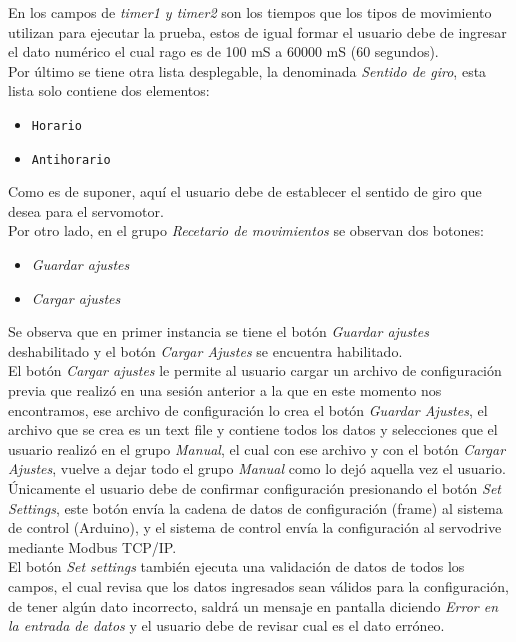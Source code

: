 \documentclass[12pt,titlepage]{article}
\begin{document}
En los campos de \textit{timer1 y timer2} son los tiempos que los tipos de movimiento utilizan para ejecutar la prueba, estos de igual formar el usuario debe de ingresar el dato numérico el cual rago es de 100 mS a 60000 mS (60 segundos). \\

Por último se tiene otra lista desplegable, la denominada \textit{Sentido de giro}, esta lista solo contiene dos elementos: \\
\begin{itemize}
\item \texttt{Horario}
\item \texttt{Antihorario}
\end{itemize}

Como es de suponer, aquí el usuario debe de establecer el sentido de giro que desea para el servomotor. \\  
 \newpage
 Por otro lado, en el grupo \textit{Recetario de movimientos} se observan dos botones: \\
 \begin{itemize}
 \item \textit{Guardar ajustes}
 \item \textit{Cargar ajustes}
 \end{itemize}
 Se observa que en primer instancia se tiene el botón \textit{Guardar ajustes} deshabilitado y el botón \textit{Cargar Ajustes} se encuentra habilitado. \\ 
 
El botón \textit{Cargar ajustes} le permite al usuario cargar un archivo de configuración previa que realizó en una sesión anterior a la que en este momento nos encontramos, ese archivo de configuración lo crea el botón \textit{Guardar Ajustes}, el archivo que se crea es un text file y contiene todos los datos y selecciones que el usuario realizó en el grupo \textit{Manual}, el cual con ese archivo y con el botón \textit{Cargar Ajustes}, vuelve a dejar todo el grupo \textit{Manual} como lo dejó aquella vez el usuario. \\

Únicamente el usuario debe de confirmar configuración presionando el botón \textit{Set Settings}, este botón envía la cadena de datos de configuración (frame) al sistema de control (Arduino), y el sistema de control envía la configuración al servodrive mediante Modbus TCP/IP.\\ 

El botón \textit{Set settings} también ejecuta una validación de datos de todos los campos, el cual revisa que los datos ingresados sean válidos para la configuración, de tener algún dato incorrecto, saldrá un mensaje en pantalla diciendo \textit{Error en la entrada de datos} y el usuario debe de revisar cual es el dato erróneo. \\
\end{document}
